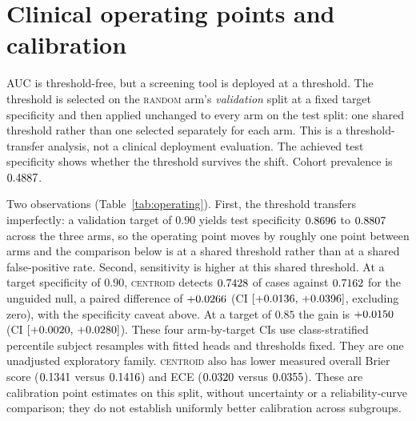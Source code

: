 \documentclass{article}
\newcommand{\ArmBest}{\textsc{centroid}}
\begin{document}
\section{Clinical operating points and calibration}
\label{app:operating}

AUC is threshold-free, but a screening tool is deployed at a threshold. The
threshold is selected on the \textsc{random} arm's \emph{validation} split at a
fixed target specificity and then applied unchanged to every arm on the test
split: one shared threshold rather than one selected separately for each arm.
This is a threshold-transfer analysis, not a clinical deployment evaluation.
The achieved test specificity shows whether the threshold
survives the shift. Cohort prevalence is $0.4887$.

\begin{table}[h]
\centering
\caption{Operating points at matched epoch 100. One threshold, chosen on the
\textsc{random} validation split to hit the target specificity, is applied
unchanged to all arms on test. ECE is a
15-bin expected calibration error.}
\label{tab:operating}
\small

\end{table}

Two observations (Table~\ref{tab:operating}). First, the threshold transfers
imperfectly: a validation target
of $0.90$ yields test specificity $0.8696$ to
$0.8807$ across the three arms, so the operating point moves
by roughly one point between arms and the comparison below is at a shared
threshold rather than at a shared false-positive rate.
Second, sensitivity is higher at this shared threshold. At a target
specificity of $0.90$, \ArmBest{} detects $0.7428$ of
cases against $0.7162$ for the unguided null, a paired difference
of $+0.0266$ (CI $[+0.0136,\,+0.0396]$, excluding zero),
with the specificity caveat above. At
a target of $0.85$ the gain is $+0.0150$
(CI $[+0.0020,\,+0.0280]$). These four arm-by-target CIs use
\Nboot{} class-stratified percentile subject resamples with fitted heads and
thresholds fixed. They are one unadjusted exploratory family. \ArmBest{} also has
lower measured overall Brier score ($0.1341$ versus $0.1416$)
and ECE ($0.0320$ versus $0.0355$). These are calibration point
estimates on this split, without uncertainty or a reliability-curve comparison;
they do not establish uniformly better calibration across subgroups.
\end{document}
